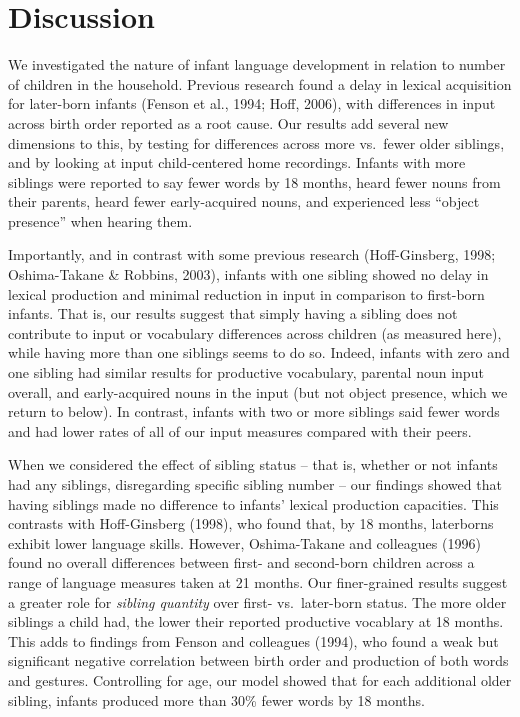 \documentclass[
  english,
  man,floatsintext]{apa6}
\begin{document}
\hypertarget{discussion}{%
\section{Discussion}\label{discussion}}

We investigated the nature of infant language development in relation to number of children in the household. Previous research found a delay in lexical acquisition for later-born infants (Fenson et al., 1994; Hoff, 2006), with differences in input across birth order reported as a root cause. Our results add several new dimensions to this, by testing for differences across more vs.~fewer older siblings, and by looking at input child-centered home recordings. Infants with more siblings were reported to say fewer words by 18 months, heard fewer nouns from their parents, heard fewer early-acquired nouns, and experienced less \enquote{object presence} when hearing them.

Importantly, and in contrast with some previous research (Hoff-Ginsberg, 1998; Oshima-Takane \& Robbins, 2003), infants with one sibling showed no delay in lexical production and minimal reduction in input in comparison to first-born infants. That is, our results suggest that simply having a sibling does not contribute to input or vocabulary differences across children (as measured here), while having more than one siblings seems to do so. Indeed, infants with zero and one sibling had similar results for productive vocabulary, parental noun input overall, and early-acquired nouns in the input (but not object presence, which we return to below). In contrast, infants with two or more siblings said fewer words and had lower rates of all of our input measures compared with their peers.

When we considered the effect of sibling status -- that is, whether or not infants had any siblings, disregarding specific sibling number -- our findings showed that having siblings made no difference to infants' lexical production capacities. This contrasts with Hoff-Ginsberg (1998), who found that, by 18 months, laterborns exhibit lower language skills. However, Oshima-Takane and colleagues (1996) found no overall differences between first- and second-born children across a range of language measures taken at 21 months. Our finer-grained results suggest a greater role for \emph{sibling quantity} over first- vs.~later-born status. The more older siblings a child had, the lower their reported productive vocablary at 18 months. This adds to findings from Fenson and colleagues (1994), who found a weak but significant negative correlation between birth order and production of both words and gestures. Controlling for age, our model showed that for each additional older sibling, infants produced more than 30\% fewer words by 18 months.
\end{document}
